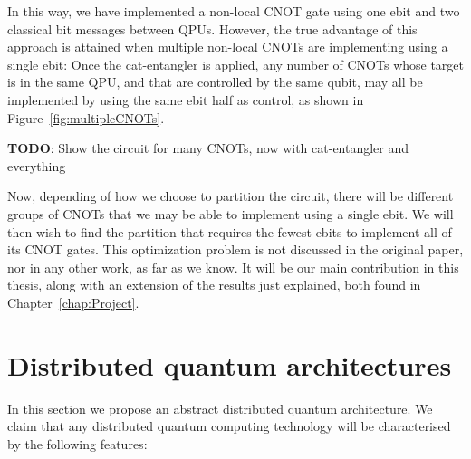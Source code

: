 In this way, we have implemented a non-local CNOT gate using one ebit and two classical bit messages between QPUs. However, the true advantage of this approach is attained when multiple non-local CNOTs are implementing using a single ebit: Once the cat-entangler is applied, any number of CNOTs whose target is in the same QPU, and that are controlled by the same qubit, may all be implemented by using the same ebit half as control, as shown in Figure~\ref{fig:multipleCNOTs}.

\textbf{TODO}: Show the circuit for many CNOTs, now with cat-entangler and everything

Now, depending of how we choose to partition the circuit, there will be different groups of CNOTs that we may be able to implement using a single ebit. We will then wish to find the partition that requires the fewest ebits to implement all of its CNOT gates. This optimization problem is not discussed in the original paper, nor in any other work, as far as we know. It will be our main contribution in this thesis, along with an extension of the results just explained, both found in Chapter~\ref{chap:Project}.


\section{Distributed quantum architectures}
\label{DQC_Architecture} 

In this section we propose an abstract distributed quantum architecture. We claim that any distributed quantum computing technology will be characterised by the following features:

